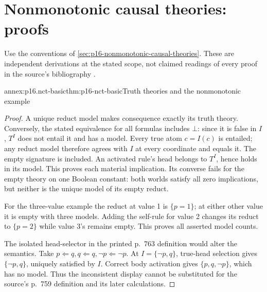 \section{Nonmonotonic causal theories: proofs}
\label{sec:annex-p16-nonmonotonic-causal-theories}
Use the conventions of \cref{sec:p16-nonmonotonic-causal-theories}.
These are independent derivations at the stated scope, not claimed readings
of every proof in the source's bibliography
\cite[pp.~759--776]{Turner2008NonmonotonicCausalLogic}.

\begin{annexitem}{annex:p16.nct-basic}{thm:p16-nct-basic}{Truth theories and the nonmonotonic example}
\begin{proof}
A unique reduct model makes consequence exactly its truth theory.
Conversely, the stated equivalence for all formulas includes \(\bot\):
since it is false in \(I\), \(T^I\) does not entail it and has a model.
Every true atom \(c=I(c)\) is entailed; any reduct model therefore agrees
with \(I\) at every coordinate and equals it. The empty signature is included.
An activated rule's head belongs to \(T^I\), hence holds in its model.
This proves each material implication. Its converse fails for the empty
theory on one Boolean constant: both worlds satisfy all zero implications,
but neither is the unique model of its empty reduct.

For the three-value example the reduct at value 1 is \(\{p=1\}\);
at either other value it is empty with three models. Adding the self-rule
for value 2 changes its reduct to \(\{p=2\}\) while value 3's remains empty.
This proves all asserted model counts.

The isolated head-selector in the printed p.~763 definition would alter
the semantics. Take \(p\Leftarrow q,q\Leftarrow q,\neg p\Leftarrow\neg p\).
At \(I=\{\neg p,q\}\), true-head selection gives \(\{\neg p,q\}\), uniquely
satisfied by \(I\). Correct body activation gives \(\{p,q,\neg p\}\),
which has no model. Thus the inconsistent display cannot be substituted
for the source's p.~759 definition and its later calculations.
\end{proof}
\end{annexitem}

